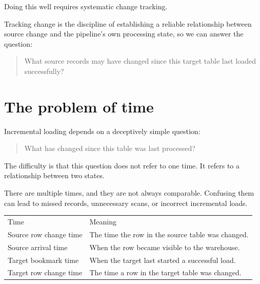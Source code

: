 \documentclass[10pt,openany,10pt]{book}
\newcounter{none}
\let\podeToprule\toprule
\let\podeMidrule\midrule
\let\podeBottomrule\bottomrule
\renewcommand{\toprule}{\arrayrulecolor{pbiGrid}\podeToprule}
\renewcommand{\midrule}{\arrayrulecolor{pbiGrid}\podeMidrule}
\renewcommand{\bottomrule}{\arrayrulecolor{pbiGrid}\podeBottomrule}
\begin{document}
Doing this well requires systematic change tracking.

Tracking change is the discipline of establishing a reliable
relationship between source change and the pipeline's own processing
state, so we can answer the question:

\begin{quote}
What source records may have changed since this target table last loaded
successfully?
\end{quote}

\section{The problem of time}\label{the-problem-of-time}

Incremental loading depends on a deceptively simple question:

\begin{quote}
What has changed since this table was last processed?
\end{quote}

The difficulty is that this question does not refer to one time. It
refers to a relationship between two states.

There are multiple times, and they are not always comparable. Confusing
them can lead to missed records, unnecessary scans, or incorrect
incremental loads.

{\def\LTcaptype{none} %
\begin{longtable}[]{@{}
  >{\raggedright\arraybackslash}p{}
  >{\raggedright\arraybackslash}p{}@{}}
\toprule\noalign{}
\begin{minipage}[b]{\linewidth}\raggedright
Time
\end{minipage} & \begin{minipage}[b]{\linewidth}\raggedright
Meaning
\end{minipage} \\
\midrule\noalign{}
\endhead
\bottomrule\noalign{}
\endlastfoot
Source row change time & The time the row in the source table was
changed. \\
Source arrival time & When the row became visible to the warehouse. \\
Target bookmark time & When the target last started a successful
load. \\
Target row change time & The time a row in the target table was
changed. \\
\end{longtable}
}
\end{document}

